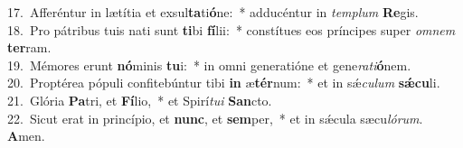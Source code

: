 {17.~}Afferéntur in lætítia et exsul\textbf{ta}ti\textbf{ó}ne:~* adducéntur in \textit{tem}\textit{plum} \textbf{Re}gis.\\
{18.~}Pro pátribus tuis nati sunt \textbf{ti}bi \textbf{fí}lii:~* constítues eos príncipes super \textit{om}\textit{nem} \textbf{ter}ram.\\
{19.~}Mémores erunt \textbf{nó}minis \textbf{tu}i:~* in omni generatióne et gene\textit{ra}\textit{ti}\textbf{ó}nem.\\
{20.~}Proptérea pópuli confitebúntur tibi \textbf{in} æ\textbf{tér}num:~* et in sǽ\textit{cu}\textit{lum} \textbf{sǽ}\textbf{cu}li.\\
{21.~}Glória \textbf{Pa}tri, et \textbf{Fí}lio,~* et Spirí\textit{tu}\textit{i} \textbf{San}cto.\\
{22.~}Sicut erat in princípio, et \textbf{nunc}, et \textbf{sem}per,~* et in sǽcula sæcu\textit{ló}\textit{rum}. \textbf{A}men.\\
